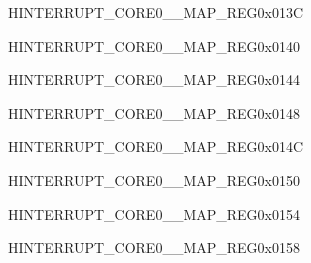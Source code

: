 \begin{register}{H}{INTERRUPT\_CORE0\_\_MAP\_REG}{0x013C}\label{regdesc:INTERRUPTCORE0DMAAPBPERIPMSMONITORVIOLATEINTRMAPREG}
\end{register}
\vspace{-3em}

\begin{register}{H}{INTERRUPT\_CORE0\_\_MAP\_REG}{0x0140}\label{regdesc:INTERRUPTCORE0CORE0IRAM0PMSMONITORVIOLATEINTRMAPREG}
\end{register}
\vspace{-3em}

\begin{register}{H}{INTERRUPT\_CORE0\_\_MAP\_REG}{0x0144}\label{regdesc:INTERRUPTCORE0CORE0DRAM0PMSMONITORVIOLATEINTRMAPREG}
\end{register}
\vspace{-3em}

\begin{register}{H}{INTERRUPT\_CORE0\_\_MAP\_REG}{0x0148}\label{regdesc:INTERRUPTCORE0CORE0PIFPMSMONITORVIOLATEINTRMAPREG}
\end{register}
\vspace{-3em}

\begin{register}{H}{INTERRUPT\_CORE0\_\_MAP\_REG}{0x014C}\label{regdesc:INTERRUPTCORE0CORE0PIFPMSMONITORVIOLATESIZEINTRMAPREG}
\end{register}
\vspace{-3em}

\begin{register}{H}{INTERRUPT\_CORE0\_\_MAP\_REG}{0x0150}\label{regdesc:INTERRUPTCORE0CORE1IRAM0PMSMONITORVIOLATEINTRMAPREG}
\end{register}
\vspace{-3em}

\begin{register}{H}{INTERRUPT\_CORE0\_\_MAP\_REG}{0x0154}\label{regdesc:INTERRUPTCORE0CORE1DRAM0PMSMONITORVIOLATEINTRMAPREG}
\end{register}
\vspace{-3em}

\begin{register}{H}{INTERRUPT\_CORE0\_\_MAP\_REG}{0x0158}\label{regdesc:INTERRUPTCORE0CORE1PIFPMSMONITORVIOLATEINTRMAPREG}
\end{register}
\vspace{-3em}

